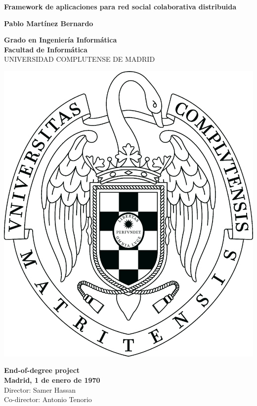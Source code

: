 \setcounter{page}{1}

\newpage
\thispagestyle{cover}
\begin{center}
  {\Huge \bf Framework de aplicaciones para red social colaborativa distribuida}

  \vfill
  {\LARGE\bf Pablo Martínez Bernardo}

  \vfill

  {\Large\bf Grado en Ingeniería Informática\\}
  {\Large\bf Facultad de Informática\\}
  \vspace*{0.2cm}
  {UNIVERSIDAD COMPLUTENSE DE MADRID}
  \vspace*{0.9cm}
  
   \begin{center}
   \includegraphics[keepaspectratio, scale=0.12]{ucmlogo.png}
   \end{center}
  
  \vspace*{0.5cm}

  {\large\bf End-of-degree project\\
             Madrid, 1 de enero de 1970\\}
  \vspace*{0.7cm}
  {\large Director: Samer Hassan\\
          Co-director: Antonio Tenorio}
  \vfill

  \rhead{}
  \rfoot{}
  \fancyhf{}

\end{center}

